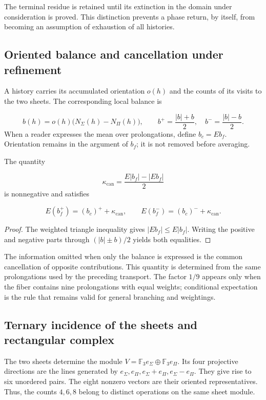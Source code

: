 The terminal residue is retained until its extinction in the domain under consideration is proved. This distinction prevents a phase return, by itself, from becoming an assumption of exhaustion of all histories.

\subsection{Oriented balance and cancellation under refinement}
A history carries its accumulated orientation \(o(h)\) and the counts of its visits to the two sheets. The corresponding local balance is

\[
b(h)=o(h)\bigl(N_\Sigma(h)-N_\Pi(h)\bigr),
\qquad
b^+=\frac{|b|+b}{2},\quad b^-=\frac{|b|-b}{2}.
\]
When a reader expresses the mean over prolongations, define \(b_c=Eb_f\). Orientation remains in the argument of \(b_f\); it is not removed before averaging.

\begin{proposition}
\label{hmtfg:base:prop:continuo-defecto-cancelacion}
The quantity

\[
\kappa_{\mathrm{can}}=
\frac{E|b_f|-|Eb_f|}{2}
\]
is nonnegative and satisfies

\[
E(b_f^+)=(b_c)^++\kappa_{\mathrm{can}},
\qquad
E(b_f^-)=(b_c)^-+\kappa_{\mathrm{can}}.
\]
\end{proposition}
\begin{proof}
The weighted triangle inequality gives \(|Eb_f|\leq E|b_f|\). Writing the positive and negative parts through \((|b|\pm b)/2\) yields both equalities.
\end{proof}

The information omitted when only the balance is expressed is the common cancellation of opposite contributions. This quantity is determined from the same prolongations used by the preceding transport. The factor \(1/9\) appears only when the fiber contains nine prolongations with equal weights; conditional expectation is the rule that remains valid for general branching and weightings.

\subsection{Ternary incidence of the sheets and rectangular complex}
The two sheets determine the module \(V=\mathbb F_3e_\Sigma\oplus\mathbb F_3e_\Pi\). Its four projective directions are the lines generated by \(e_\Sigma,e_\Pi,e_\Sigma+e_\Pi,e_\Sigma-e_\Pi\). They give rise to six unordered pairs. The eight nonzero vectors are their oriented representatives. Thus, the counts \(4,6,8\) belong to distinct operations on the same sheet module.

